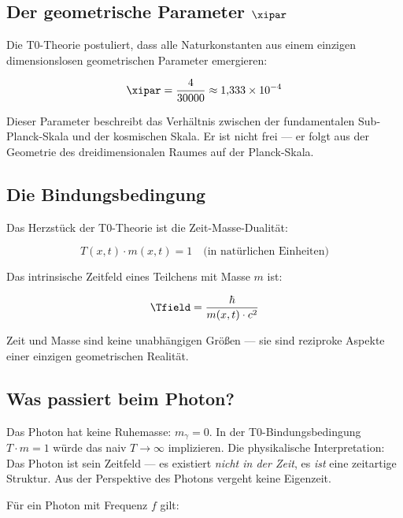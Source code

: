 \subsection{Der geometrische Parameter $\xipar$}

Die T0-Theorie postuliert, dass alle Naturkonstanten aus einem einzigen 
dimensionslosen geometrischen Parameter emergieren:

\begin{equation}
    \xipar = \frac{4}{30000} \approx 1{,}333 \times 10^{-4}
    \label{eq:xi_definition}
\end{equation}

Dieser Parameter beschreibt das Verhältnis zwischen der fundamentalen Sub-Planck-Skala 
und der kosmischen Skala. Er ist nicht frei — er folgt aus der Geometrie des 
dreidimensionalen Raumes auf der Planck-Skala.

\subsection{Die Bindungsbedingung}

Das Herzstück der T0-Theorie ist die Zeit-Masse-Dualität:

\begin{equation}
    T(x,t) \cdot m(x,t) = 1 \quad \text{(in natürlichen Einheiten)}
    \label{eq:t0_constraint}
\end{equation}

Das intrinsische Zeitfeld eines Teilchens mit Masse $m$ ist:

\begin{equation}
    \Tfield = \frac{\hbar}{m(x,t) \cdot c^2}
    \label{eq:timefield}
\end{equation}

Zeit und Masse sind keine unabhängigen Größen — sie sind reziproke Aspekte einer 
einzigen geometrischen Realität.

\subsection{Was passiert beim Photon?}

Das Photon hat keine Ruhemasse: $m_\gamma = 0$. In der T0-Bindungsbedingung 
$T \cdot m = 1$ würde das naiv $T \to \infty$ implizieren. Die physikalische 
Interpretation: Das Photon ist sein Zeitfeld — es existiert \emph{nicht in der Zeit}, 
es \emph{ist} eine zeitartige Struktur. Aus der Perspektive des Photons vergeht 
keine Eigenzeit.

Für ein Photon mit Frequenz $f$ gilt:

